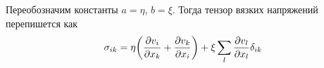 
Переобозначим константы $a=\eta$, $b=\xi$. Тогда тензор вязких напряжений перепишется как
\begin{equation}
    \sigma_{ik} = \eta \qty(\pdv{v_i}{x_k}+\pdv{v_k}{x_i})+\xi \sum\limits_l \pdv{v_l}{x_l} \delta_{ik}
\end{equation}




